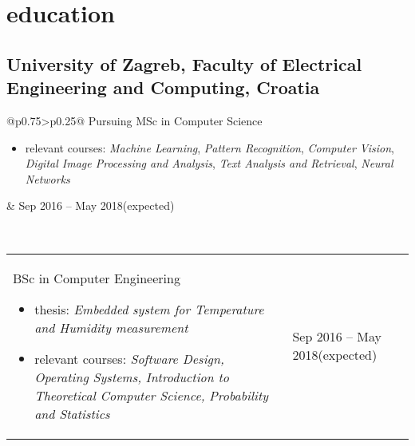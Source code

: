 \documentclass[a4paper]{article}
\makeatletter
\newlength{\tablewidth}
\newenvironment{period}[2]{%
\newcommand{\sarma}{#2}%
\setlength{\tablewidth}{\linewidth}
\addtolength{\tablewidth}{-2\tabcolsep}
\begin{tabular}{@{}p{0.75\tablewidth}>{\raggedleft\arraybackslash}p{0.25\tablewidth}@{}}%
#1 \newline
\begin{itemize}
}{%
\end{itemize} & \sarma \\%
\end{tabular}\\
}
\makeatother
\begin{document}
\section{education}
\subsection{University of Zagreb, Faculty of Electrical Engineering and Computing, Croatia}
\begin{period}{Pursuing MSc in Computer Science}{Sep 2016 -- May 2018\linebreak(expected)}
    \item relevant courses:
        \textit{Machine Learning},
        \textit{Pattern Recognition},
        \textit{Computer Vision},
        \textit{Digital Image Processing and Analysis},
        \textit{Text Analysis and Retrieval},
        \textit{Neural Networks}
\end{period}
\begin{period}{BSc in Computer Engineering}{Sep 2012 -- Jul 2016}
    \item thesis:
        \textit{Embedded system for Temperature and Humidity measurement}
    \item relevant courses:
	\textit{Software Design,}
	\textit{Operating Systems,}
	\textit{Introduction to Theoretical Computer Science,}
	\textit{Probability and Statistics}
\end{period}
\end{document}
